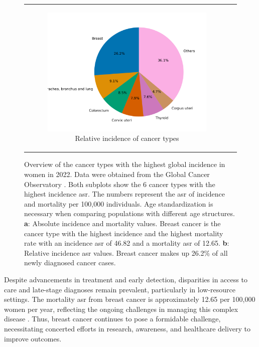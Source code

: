\begin{figure}[ht]
\begin{tabular}{cc}
\begin{subfigure}{0.5\textwidth}
            \includegraphics[width=\linewidth]{chapters/2_background/figures/pie.png}
            \caption{Relative incidence of cancer types}
            \label{fig:brca_pie}
        \end{subfigure} \end{tabular} \caption{Overview of the cancer types
        with the highest global incidence in women in 2022.
        Data were obtained from the Global Cancer Observatory
        \supercite{bray_global_2024,ferlay_global_2024}.
        Both subplots show the 6 cancer types with the highest incidence \gls{asr}.
        The numbers represent the \gls{asr} of incidence and mortality per 100,000
        individuals.
        Age standardization is necessary when comparing populations with different age
        structures\supercite{segi_age-adjusted_1960,doll_cancer_1966}.
        \textbf{a}: Absolute incidence and mortality values.
        Breast cancer is the cancer type with the highest incidence and the highest
        mortality rate with an incidence \gls{asr} of 46.82 and a mortality \gls{asr}
        of 12.65.
        \textbf{b}: Relative incidence \gls{asr} values.
        Breast cancer makes up 26.2\% of all newly diagnosed cancer cases.
    }
    \label{fig:brca_incidence_mortality} \end{figure}

Despite advancements in treatment and early detection, disparities in access to
care and late-stage diagnoses remain prevalent, particularly in low-resource
settings\supercite{wilkinson_understanding_2022,ginsburg_breast_2020}.
The mortality \gls{asr} from breast cancer is approximately 12.65 per 100,000 women
per year, reflecting the ongoing challenges in managing this complex disease
\supercite{bray_global_2024,ferlay_global_2024}.
Thus, breast cancer continues to pose a formidable challenge, necessitating
concerted efforts in research, awareness, and healthcare delivery to improve
outcomes\supercite{desantis_breast_2019}.

